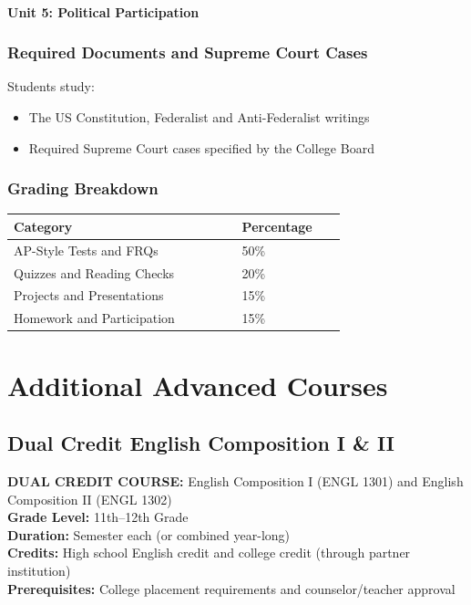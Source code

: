 \documentclass[12pt,oneside]{book}
\begin{document}
\subsection*{Unit 5: Political Participation}

\section{Required Documents and Supreme Court Cases}
Students study:
\begin{itemize}[leftmargin=2em]
    \item The US Constitution, Federalist and Anti-Federalist writings
    \item Required Supreme Court cases specified by the College Board
\end{itemize}

\section{Grading Breakdown}
\begin{center}
\begin{tabular}{L{0.55\linewidth}L{0.25\linewidth}}
\toprule
\textbf{Category} & \textbf{Percentage} \\
\midrule
AP-Style Tests and FRQs & 50\% \\
Quizzes and Reading Checks & 20\% \\
Projects and Presentations & 15\% \\
Homework and Participation & 15\% \\
\bottomrule
\end{tabular}
\end{center}

\part{Additional Advanced Courses}

\chapter{Dual Credit English Composition I \& II}

\noindent\textbf{DUAL CREDIT COURSE:} English Composition I (ENGL 1301) and English Composition II (ENGL 1302)\\
\textbf{Grade Level:} 11th--12th Grade\\
\textbf{Duration:} Semester each (or combined year-long)\\
\textbf{Credits:} High school English credit and college credit (through partner institution)\\
\textbf{Prerequisites:} College placement requirements and counselor/teacher approval
\end{document}
